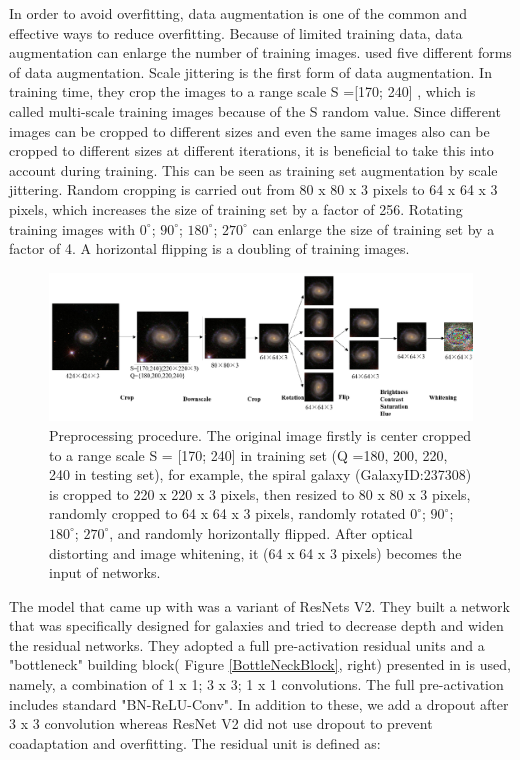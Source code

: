 \documentclass[a4paper,12pt]{report}
\begin{document}
\hspace*{0.5 in}In order to avoid overfitting, data augmentation is one of the common and effective ways to reduce overfitting. Because of limited training data, data augmentation can enlarge the number of training images. \citep{dai2018galaxy} used five different forms
of data augmentation. Scale jittering is the first form of data augmentation.
In training time, they crop the images to a range scale S =[170; 240] , which is called multi-scale training images because of the S random value. Since different images can be
cropped to different sizes and even the same images also can be cropped to different sizes at different iterations, it is beneficial to take this into account during training. This can be
seen as training set augmentation by scale jittering. Random cropping is carried out from 80 x 80 x 3 pixels to 64 x 64 x 3 pixels, which increases the size of training set by a factor of 256. Rotating training images with $0^{\circ}$; $90^{\circ}$; $180^{\circ}$; $270^{\circ}$ can enlarge the size of training set by a factor of 4. A horizontal flipping is a doubling of training images.\\
\begin{figure}[H]
    \centering
    \includegraphics[width=\textwidth]{figures/Preprocessing.png}
    \caption{Preprocessing procedure. The original image firstly is center cropped to a range scale S = [170; 240] in training set (Q ={180, 200, 220, 240} in testing set), for example, the spiral galaxy (GalaxyID:237308) is cropped to 220 x 220 x 3 pixels, then resized to 80 x 80 x 3 pixels, randomly cropped to 64 x 64 x 3 pixels, randomly rotated $0^{\circ}$; $90^{\circ}$; $180^{\circ}$; $270^{\circ}$, and randomly horizontally flipped. After optical distorting and image whitening, it (64 x 64 x 3 pixels) becomes the input of networks.}
    \label{preprocessing_dai}
\end{figure}
\hspace*{0.5 in}The model that \citep{dai2018galaxy} came up with was a variant of ResNets V2. They built a network that was specifically designed for galaxies and tried to decrease depth and widen the residual networks. They adopted a full pre-activation residual units and a "bottleneck" building block( Figure \ref{BottleNeckBlock}, right) presented in \citep{He2016a} is used, namely, a combination of 1 x 1; 3 x 3; 1 x 1 convolutions. The full pre-activation includes standard "BN-ReLU-Conv". In addition to these, we add a dropout after 3 x 3 convolution whereas ResNet V2 \citep{He2016a} did not use dropout to prevent coadaptation and overfitting. The residual unit is defined as:
\end{document}
